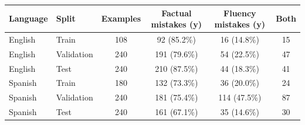\begin{tabular}{llcccc}
\hline
\textbf{Language} & \textbf{Split} & \textbf{Examples} & \textbf{Factual mistakes (y)} & \textbf{Fluency mistakes (y)} & \textbf{Both} \\
\hline
English & Train & 108 & 92 (85.2\%) & 16 (14.8\%) & 15 \\
English & Validation & 240 & 191 (79.6\%) & 54 (22.5\%) & 47 \\
English & Test & 240 & 210 (87.5\%) & 44 (18.3\%) & 41 \\
Spanish & Train & 180 & 132 (73.3\%) & 36 (20.0\%) & 24 \\
Spanish & Validation & 240 & 181 (75.4\%) & 114 (47.5\%) & 87 \\
Spanish & Test & 240 & 161 (67.1\%) & 35 (14.6\%) & 30 \\
\hline
\end{tabular}
